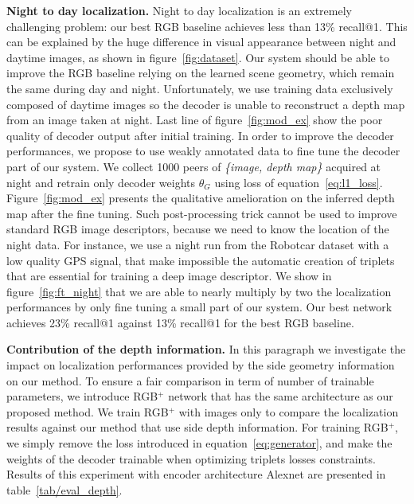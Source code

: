 \vspace{4pt}\noindent\textbf{Night to day localization.} Night to day localization is an extremely challenging problem: our best RGB baseline achieves less than 13\% recall@1. This can be explained by the huge difference in visual appearance between night and daytime images, as shown in figure~\ref{fig:dataset}. Our system should be able to improve the RGB baseline relying on the learned scene geometry, which remain the same during day and night. Unfortunately, we use training data exclusively composed of daytime images so the decoder is unable to reconstruct a depth map from an image taken at night. Last line of figure~\ref{fig:mod_ex} show the poor quality of decoder output after initial training. In order to improve the decoder performances, we propose to use weakly annotated data to fine tune the decoder part of our system. We collect 1000 peers of \textit{\{image, depth map\}} acquired at night and retrain only decoder weights $\theta_G$ using loss of equation~\ref{eq:l1_loss}. Figure~\ref{fig:mod_ex} presents the qualitative amelioration on the inferred depth map after the fine tuning. Such post-processing trick cannot be used to improve standard RGB image descriptors, because we need to know the location of the night data. For instance, we use a night run from the Robotcar dataset with a low quality GPS signal, that make impossible the automatic creation of triplets that are essential for training a deep image descriptor. We show in figure~\ref{fig:ft_night} that we are able to nearly multiply by two the localization performances by only fine tuning a small part of our system. Our best network achieves 23\% recall@1 against 13\% recall@1 for the best RGB baseline.

\vspace{4pt}\noindent\textbf{Contribution of the depth information.} In this paragraph we investigate the impact on localization performances provided by the side geometry information on our method. To ensure a fair comparison in term of number of trainable parameters, we introduce RGB$^+$ network that has the same architecture as our proposed method. We train RGB$^+$ with images only to compare the localization results against our method that use side depth information. For training RGB$^+$, we simply remove the loss introduced in equation~\ref{eq:generator}, and make the weights of the decoder trainable when optimizing triplets losses constraints. Results of this experiment with encoder architecture Alexnet are presented in table~\ref{tab/eval_depth}.

